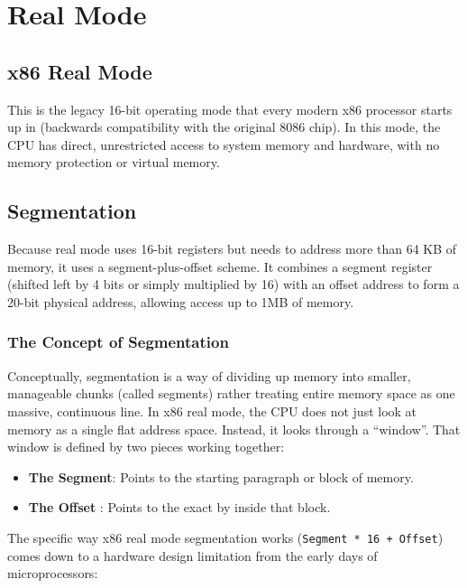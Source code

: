 \chapter{Real Mode}

\section{x86 Real Mode}

This is the legacy 16-bit operating mode that every modern x86 processor starts
up in (backwards compatibility with the original 8086 chip). In this mode, the
CPU has direct, unrestricted access to system memory and hardware, with no
memory protection or virtual memory.

\section{Segmentation}

Because real mode uses 16-bit registers but needs to address more than 64 KB of
memory, it uses a segment-plus-offset scheme. It combines a segment register
(shifted left by 4 bits or simply multiplied by 16) with an offset address to
form a 20-bit physical address, allowing access up to 1MB of memory.

\subsection{The Concept of Segmentation}

Conceptually, segmentation is a way of dividing up memory into smaller,
manageable chunks (called segments) rather treating entire memory space as one
massive, continuous line.
In x86 real mode, the CPU does not just look at memory as a single flat address
space. Instead, it looks through a ``window''. That window is defined by two
pieces working together:

\begin{itemize}
\tightlist
\item
  \textbf{The Segment}: Points to the starting paragraph or block of memory.
\item
  \textbf{The Offset} : Points to the exact by inside that block.
\end{itemize}

The specific way x86 real mode segmentation works (\texttt{Segment\ *\ 16\ +\ Offset}) comes down to a hardware design limitation from the early days of microprocessors:

